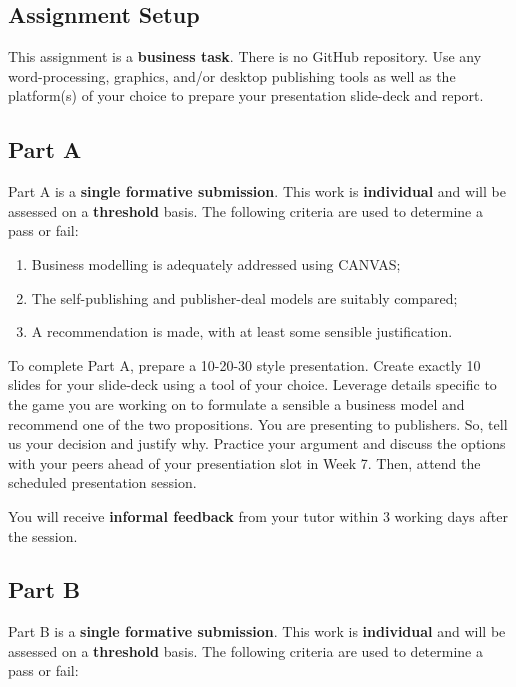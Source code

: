 \documentclass{../../fal_assignment}
\begin{document}
\subsection*{Assignment Setup}

This assignment is a \textbf{business task}. There is no GitHub repository. Use any word-processing, graphics, and/or desktop publishing tools as well as the platform(s) of your choice to prepare your presentation slide-deck and report.

\subsection*{Part A}

Part A is a \textbf{single formative submission}. This work is \textbf{individual} and will be assessed on a \textbf{threshold} basis. The following criteria are used to determine a pass or fail:

\begin{enumerate}[label=(\alph*)]
	\item Business modelling is adequately addressed using CANVAS;
	\item The self-publishing and publisher-deal models are suitably compared;
	\item A recommendation is made, with at least some sensible justification.
\end{enumerate}

To complete Part A, prepare a 10-20-30 style presentation. Create exactly 10 slides for your slide-deck using a tool of your choice. Leverage details specific to the game you are working on to formulate a sensible a business model and recommend one of the two propositions. You are presenting to publishers. So, tell us your decision and justify why. Practice your argument and discuss the options with your peers ahead of your presentiation slot in Week 7. Then, attend the scheduled presentation session.

You will receive \textbf{informal feedback} from your tutor within 3 working days after the session.

\subsection*{Part B}

Part B is a \textbf{single formative submission}. This work is \textbf{individual} and will be assessed on a \textbf{threshold} basis. The following criteria are used to determine a pass or fail:
\end{document}

